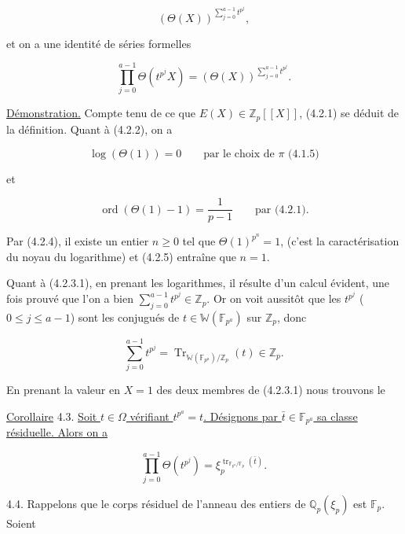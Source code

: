 
\[
(\Theta(X))^{\sum_{j=0}^{a-1}t^{p^j}},
\]

et on a une identité de séries formelles

\begin{equation}\tag{4.2.3.1}
\prod_{j=0}^{a-1}\Theta(t^{p^j}X)
=(\Theta(X))^{\sum_{j=0}^{a-1}t^{p^j}}.
\end{equation}

\underline{Démonstration.} Compte tenu de ce que
$E(X)\in\mathbb Z_p[[X]]$, (4.2.1) se déduit de la définition. Quant à
(4.2.2), on a

\begin{equation}\tag{4.2.4}
\log(\Theta(1))=0
\qquad\text{par le choix de $\pi$ (4.1.5)}
\end{equation}

et

\begin{equation}\tag{4.2.5}
\operatorname{ord}(\Theta(1)-1)=\frac1{p-1}
\qquad\text{par (4.2.1).}
\end{equation}

Par (4.2.4), il existe un entier $n\geq0$ tel que
$\Theta(1)^{p^n}=1$, (c'est la caractérisation du noyau du logarithme) et
(4.2.5) entraîne que $n=1$.

Quant à (4.2.3.1), en prenant les logarithmes, il résulte d'un calcul évident,
une fois prouvé que l'on a bien
$\sum_{j=0}^{a-1}t^{p^j}\in\mathbb Z_p$. Or on voit aussitôt que les
$t^{p^j}$ ($0\leq j\leq a-1$) sont les conjugués de
$t\in\mathbb W(\mathbb F_{p^a})$ sur $\mathbb Z_p$, donc

\[
\sum_{j=0}^{a-1}t^{p^j}
=\operatorname{Tr}_{\mathbb W(\mathbb F_{p^a})/\mathbb Z_p}(t)\in\mathbb Z_p.
\]

En prenant la valeur en $X=1$ des deux membres de (4.2.3.1) nous trouvons le

\underline{Corollaire} 4.3. \underline{Soit $t\in\Omega$ vérifiant $t^{p^a}=t$.
Désignons par $\bar t\in\mathbb F_{p^a}$ sa classe résiduelle. Alors on a}

\begin{equation}\tag{4.3.1}
\prod_{j=0}^{a-1}\Theta(t^{p^j})
=\xi_p^{\operatorname{tr}_{\mathbb F_{p^a}/\mathbb F_p}(\bar t)}.
\end{equation}


4.4. Rappelons que le corps résiduel de l'anneau des entiers de
$\mathbb Q_p(\xi_p)$ est $\mathbb F_p$. Soient

